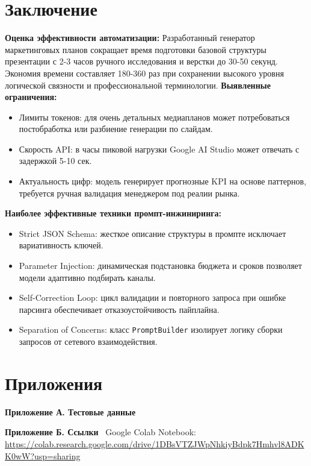 \documentclass[oneside,a4paper,14pt]{extarticle}
\begin{document}
	\section*{Заключение}
	\noindent
	\textbf{Оценка эффективности автоматизации:} Разработанный генератор маркетинговых планов сокращает время подготовки базовой структуры презентации с 2-3 часов ручного исследования и верстки до 30-50 секунд. Экономия времени составляет 180-360 раз при сохранении высокого уровня логической связности и профессиональной терминологии.
	\noindent
	\textbf{Выявленные ограничения:}
	\begin{itemize}
	\item Лимиты токенов: для очень детальных медиапланов может потребоваться постобработка или разбиение генерации по слайдам.
	\item Скорость API: в часы пиковой нагрузки Google AI Studio может отвечать с задержкой 5-10 сек.
	\item Актуальность цифр: модель генерирует прогнозные KPI на основе паттернов, требуется ручная валидация менеджером под реалии рынка.
	\end{itemize}
	\noindent
	\textbf{Наиболее эффективные техники промпт-инжиниринга:}
	\begin{itemize}
	\item Strict JSON Schema: жесткое описание структуры в промпте исключает вариативность ключей.
	\item Parameter Injection: динамическая подстановка бюджета и сроков позволяет модели адаптивно подбирать каналы.
	\item Self-Correction Loop: цикл валидации и повторного запроса при ошибке парсинга обеспечивает отказоустойчивость пайплайна.
	\item Separation of Concerns: класс \texttt{PromptBuilder} изолирует логику сборки запросов от сетевого взаимодействия.
	\end{itemize}
	\section*{Приложения}
	\noindent
	\textbf{Приложение А. Тестовые данные}
	
	\noindent
	\textbf{Приложение Б. Ссылки} \
	Google Colab Notebook: \url{https://colab.research.google.com/drive/1DBsVTZJWpNhkiyBdpk7Hmhvl8ADKK0wW?usp=sharing} \
\end{document}
